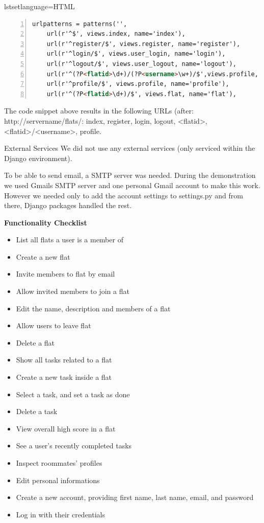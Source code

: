 \documentclass{sig-alt-release2}
\begin{document}
lstset{language=HTML} 

\begin{lstlisting}[language=HTML, numbers=left, linewidth=8.5cm, breaklines=true, breakautoindent=true]
urlpatterns = patterns('',
	url(r'^$', views.index, name='index'),
	url(r'^register/$', views.register, name='register'),
	url(r'^login/$', views.user_login, name='login'),
	url(r'^logout/$', views.user_logout, name='logout'),
    url(r'^(?P<flatid>\d+)/(?P<username>\w+)/$',views.profile, name='flatuser'),
	url(r'^profile/$', views.profile, name='profile'),
   	url(r'^(?P<flatid>\d+)/$', views.flat, name='flat'),
\end{lstlisting}



The code snippet above results in the following URLs (after: http://servername/flats/:
index, register, login, logout, <flatid>, <flatid>/<username>, profile.

External Services
We did not use any external services (only serviced within the Django environment).

To be able to send email, a SMTP server was needed. During the demonstration we used Gmails SMTP server and one personal Gmail account to make this work. However we needed only to add the account settings to settings.py and from there, Django packages handled the rest.


\textbf{Functionality Checklist}
\begin{itemize}
\item List all flats a user is a member of
\item Create a new flat
\item Invite members to flat by email
\item Allow invited members to join a flat 
\item Edit the name, description and members of a flat
\item Allow users to leave flat
\item Delete a flat
\item Show all tasks related to a flat
\item Create a new task inside a flat
\item Select a task, and set a task as done
\item Delete a task
\item View overall high score in a flat
\item See a user’s recently completed tasks
\item Inspect roommates{’} profiles
\item Edit personal informations
\item Create a new account, providing first name, last name, email, and password
\item Log in with their credentials
\end{itemize}
\end{document}
